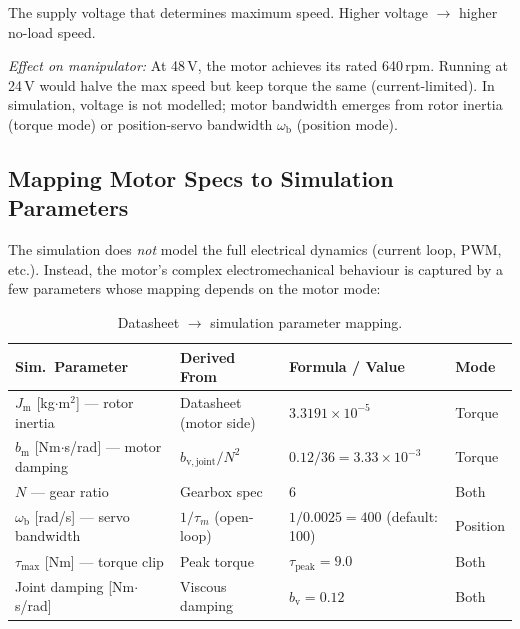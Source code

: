 \documentclass[11pt,a4paper]{article}
\newcommand{\wb}{\omega_{\mathrm{b}}}
\newcommand{\Jm}{J_{\mathrm{m}}}
\begin{document}
\begin{description}[leftmargin=2em, style=nextline, font=\bfseries\sffamily\color{seaorange}]
\item[Rated voltage ($V_{\mathrm{bus}} = 48$\,V)]
The supply voltage that determines maximum speed.  Higher voltage $\to$ higher no-load speed.

\textit{Effect on manipulator:}  At 48\,V, the motor achieves its rated 640\,rpm.  Running at 24\,V would halve the max speed but keep torque the same (current-limited).  In simulation, voltage is not modelled; motor bandwidth emerges from rotor inertia (torque mode) or position-servo bandwidth $\wb$ (position mode).

\end{description}


\subsection{Mapping Motor Specs to Simulation Parameters}
\label{sec:motor_mapping}

The simulation does \emph{not} model the full electrical dynamics (current loop, PWM, etc.).  Instead, the motor's complex electromechanical behaviour is captured by a few parameters whose mapping depends on the motor mode:

\begin{table}[H]
\centering
\caption{Datasheet $\to$ simulation parameter mapping.}
\label{tab:motor_mapping}
\begin{tabular}{llll}
\toprule
\textbf{Sim.\ Parameter} & \textbf{Derived From} & \textbf{Formula / Value} & \textbf{Mode} \\
\midrule
$\Jm$ [kg$\cdot$m$^2$] — rotor inertia & Datasheet (motor side) & $3.3191\times10^{-5}$ & Torque \\
$b_{\mathrm{m}}$ [Nm$\cdot$s/rad] — motor damping & $b_{\mathrm{v,joint}} / N^2$ & $0.12 / 36 = 3.33\times10^{-3}$ & Torque \\
$N$ — gear ratio & Gearbox spec & $6$ & Both \\
$\wb$ [rad/s] — servo bandwidth & $1 / \tau_m$ (open-loop) & $1 / 0.0025 = 400$ (default: 100) & Position \\
$\tau_{\max}$ [Nm] — torque clip & Peak torque & $\tau_{\mathrm{peak}} = 9.0$ & Both \\
Joint damping [Nm$\cdot$s/rad] & Viscous damping & $b_{\mathrm{v}} = 0.12$ & Both \\
\bottomrule
\end{tabular}
\end{table}
\end{document}
